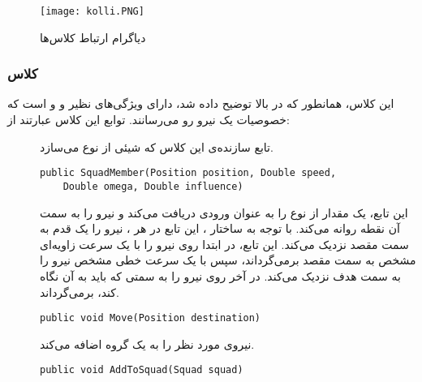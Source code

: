 \begin{figure}[htb]
  \begin{center}
    \texttt{[image: kolli.PNG]}
    \caption{دیاگرام ارتباط کلاس‌ها
    \label{fig4-0}}
  \end{center}
\end{figure}

\subsubsection{کلاس }
این کلاس، همانطور که در بالا توضیح داده شد، دارای ویژگی‌های نظیر  و  و  است که
خصوصیات یک نیرو رو می‌رسانند. توابع این کلاس عبارتند از:
\begin{description}
  \item[] 
  تابع سازنده‌ی این کلاس که شیئی از نوع  می‌سازد.
\begin{latin}
{\linespread{1.2}
{\inconsolata
\lstset{language=Java}
\begin{lstlisting}
public SquadMember(Position position, Double speed,
    Double omega, Double influence)
\end{lstlisting}
}
}
\end{latin}

  \item[]
  این تابع، یک مقدار از نوع  را به عنوان ورودی دریافت می‌کند و نیرو را به سمت آن نقطه روانه می‌کند.
  با توجه به ساختار ، این تابع در هر ، نیرو را یک قدم به سمت مقصد نزدیک می‌کند.
  این تابع، در ابتدا روی نیرو را با یک سرعت زاویه‌ای مشخص به سمت مقصد برمی‌گرداند، سپس با یک سرعت خطی مشخص
  نیرو را به سمت هدف نزدیک می‌کند. در آخر روی نیرو را به سمتی که باید به آن نگاه کند، برمی‌گرداند.
\begin{latin}
{\linespread{1.2}
{\inconsolata
\lstset{language=Java}
\begin{lstlisting}
public void Move(Position destination)
\end{lstlisting}
}
}
\end{latin}

  \item[]
  نیروی مورد نظر را به یک گروه اضافه می‌کند.
\begin{latin}
{\linespread{1.2}
{\inconsolata
\lstset{language=Java}
\begin{lstlisting}
public void AddToSquad(Squad squad)
\end{lstlisting}
}
}
\end{latin}


\end{description}
